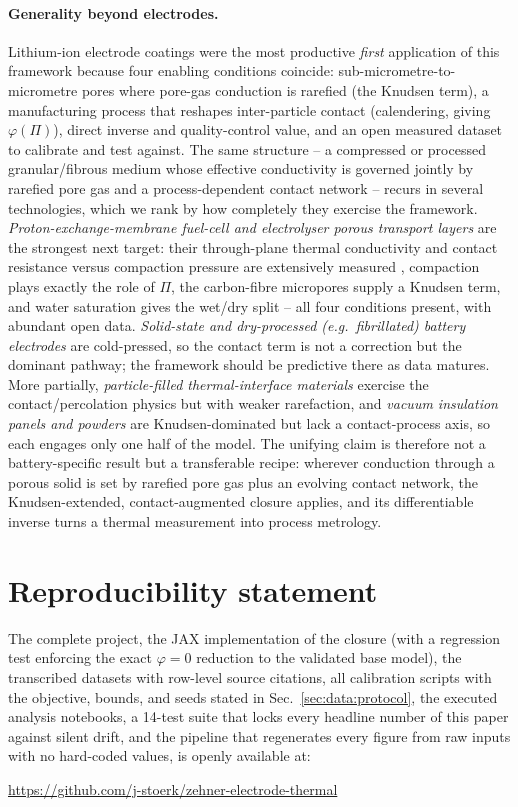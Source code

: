 \documentclass[10pt,a4paper]{article}
\begin{document}
\paragraph{Generality beyond electrodes.}
Lithium-ion electrode coatings were the most productive \emph{first} application of this framework because four enabling conditions coincide: sub-micrometre-to-micrometre pores where pore-gas conduction is rarefied (the Knudsen term), a manufacturing process that reshapes inter-particle contact (calendering, giving $\varphi(\Pi)$), direct inverse and quality-control value, and an open measured dataset to calibrate and test against. The same structure -- a compressed or processed granular/fibrous medium whose effective conductivity is governed jointly by rarefied pore gas and a process-dependent contact network -- recurs in several technologies, which we rank by how completely they exercise the framework. \emph{Proton-exchange-membrane fuel-cell and electrolyser porous transport layers} are the strongest next target: their through-plane thermal conductivity and contact resistance versus compaction pressure are extensively measured \cite{burheim2010}, compaction plays exactly the role of $\Pi$, the carbon-fibre micropores supply a Knudsen term, and water saturation gives the wet/dry split -- all four conditions present, with abundant open data. \emph{Solid-state and dry-processed (e.g.\ fibrillated) battery electrodes} are cold-pressed, so the contact term is not a correction but the dominant pathway; the framework should be predictive there as data matures. More partially, \emph{particle-filled thermal-interface materials} exercise the contact/percolation physics but with weaker rarefaction, and \emph{vacuum insulation panels and powders} are Knudsen-dominated but lack a contact-process axis, so each engages only one half of the model. The unifying claim is therefore not a battery-specific result but a transferable recipe: wherever conduction through a porous solid is set by rarefied pore gas plus an evolving contact network, the Knudsen-extended, contact-augmented closure applies, and its differentiable inverse turns a thermal measurement into process metrology.

\section*{Reproducibility statement}
The complete project, the JAX implementation of the closure (with a regression test enforcing the exact $\varphi=0$ reduction to the validated base model), the transcribed datasets with row-level source citations, all calibration scripts with the objective, bounds, and seeds stated in Sec.~\ref{sec:data:protocol}, the executed analysis notebooks, a 14-test suite that locks every headline number of this paper against silent drift, and the pipeline that regenerates every figure from raw inputs with no hard-coded values, is openly available at:
\begin{center}
\url{https://github.com/j-stoerk/zehner-electrode-thermal}
\end{center}
\end{document}
